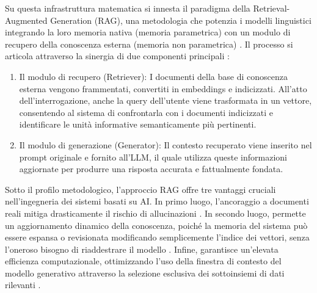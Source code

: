 Su questa infrastruttura matematica si innesta il paradigma della
Retrieval-Augmented Generation (RAG), una metodologia che potenzia i
modelli linguistici integrando la loro memoria nativa (memoria
parametrica) con un modulo di recupero della conoscenza esterna
(memoria non parametrica) \cite{lewis2021retrievalaugmentedgenerationknowledgeintensivenlp}. Il processo si articola
attraverso la sinergia di due componenti principali \cite{gupta2024comprehensivesurveyretrievalaugmentedgeneration}:

\begin{enumerate}
\def\labelenumi{\arabic{enumi}.}
\item
  Il modulo di recupero (Retriever): I documenti della base di
  conoscenza esterna vengono frammentati, convertiti in embeddings e
  indicizzati. All'atto dell'interrogazione, anche la query dell'utente
  viene trasformata in un vettore, consentendo al sistema di
  confrontarla con i documenti indicizzati e identificare le unità
  informative semanticamente più pertinenti.
\item
  Il modulo di generazione (Generator): Il contesto recuperato viene
  inserito nel prompt originale e fornito all'LLM, il quale utilizza
  queste informazioni aggiornate per produrre una risposta accurata e
  fattualmente fondata.
\end{enumerate}

Sotto il profilo metodologico, l'approccio RAG offre tre vantaggi
cruciali nell'ingegneria dei sistemi basati su AI. In primo luogo,
l'ancoraggio a documenti reali mitiga drasticamente il rischio di
allucinazioni \cite{lewis2021retrievalaugmentedgenerationknowledgeintensivenlp, gupta2024comprehensivesurveyretrievalaugmentedgeneration, enwiki:1360040196}. In secondo luogo, permette un
aggiornamento dinamico della conoscenza, poiché la memoria del sistema
può essere espansa o revisionata modificando semplicemente l'indice dei
vettori, senza l'oneroso bisogno di riaddestrare il modello \cite{gupta2024comprehensivesurveyretrievalaugmentedgeneration,
lewis2021retrievalaugmentedgenerationknowledgeintensivenlp}. Infine, garantisce un'elevata efficienza computazionale,
ottimizzando l'uso della finestra di contesto del modello generativo
attraverso la selezione esclusiva dei sottoinsiemi di dati rilevanti
\cite{glass2025extractiveschemalinkingtexttosql}.

